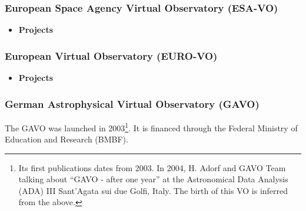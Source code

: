 \subsubsection{European Space Agency Virtual Observatory (ESA-VO)}
\begin{itemize}
	\item \textbf{Projects}
\end{itemize}

\subsubsection{European Virtual Observatory (EURO-VO)}
\begin{itemize}
	\item \textbf{Projects}
\end{itemize}

\subsubsection{German Astrophysical Virtual Observatory (GAVO)}
The GAVO was launched in 2003\footnote{Its first publications dates from 2003.
In 2004, H. Adorf and GAVO Team talking about ``GAVO - after one year'' at the
Astronomical Data Analysis (ADA) III Sant'Agata sui due Golfi, Italy. The birth
of this VO is inferred from the above.}. It is financed through the Federal
Ministry of Education and Research (BMBF).

